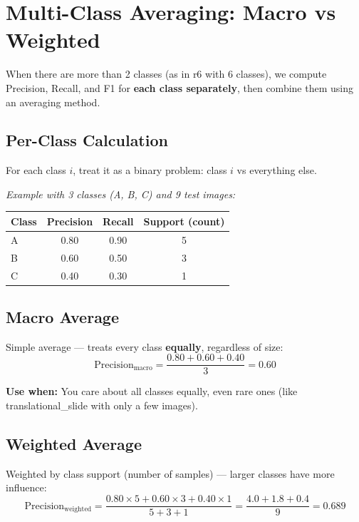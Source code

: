 \documentclass[11pt]{article}
\begin{document}
\section{Multi-Class Averaging: Macro vs Weighted}

When there are more than 2 classes (as in r6 with 6 classes), we compute Precision, Recall, and F1 for \textbf{each class separately}, then combine them using an averaging method.

\subsection{Per-Class Calculation}

For each class $i$, treat it as a binary problem: class $i$ vs everything else.

\medskip
\noindent\textit{Example with 3 classes (A, B, C) and 9 test images:}

\begin{center}
\begin{tabular}{lccc}
\toprule
\textbf{Class} & \textbf{Precision} & \textbf{Recall} & \textbf{Support (count)} \\
\midrule
A & 0.80 & 0.90 & 5 \\
B & 0.60 & 0.50 & 3 \\
C & 0.40 & 0.30 & 1 \\
\bottomrule
\end{tabular}
\end{center}

\subsection{Macro Average}

Simple average --- treats every class \textbf{equally}, regardless of size:
\[
\text{Precision}_{\text{macro}} = \frac{0.80 + 0.60 + 0.40}{3} = \boxed{0.60}
\]

\noindent\textbf{Use when:} You care about all classes equally, even rare ones (like translational\_slide with only a few images).

\subsection{Weighted Average}

Weighted by class support (number of samples) --- larger classes have more influence:
\[
\text{Precision}_{\text{weighted}} = \frac{0.80 \times 5 + 0.60 \times 3 + 0.40 \times 1}{5 + 3 + 1} = \frac{4.0 + 1.8 + 0.4}{9} = \boxed{0.689}
\]
\end{document}
